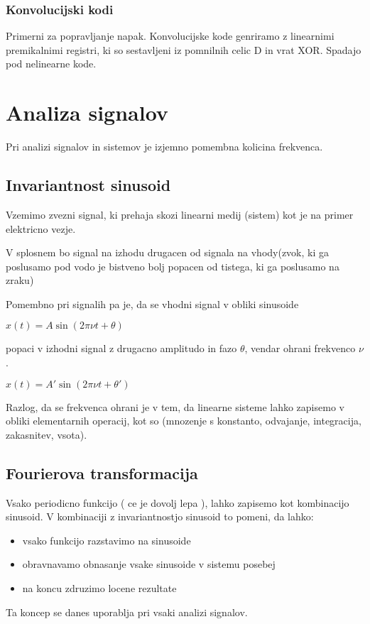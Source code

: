 \documentclass{article}
\begin{document}
\begin{multicols}{2}
	\subsubsection{Konvolucijski kodi}
	Primerni za popravljanje napak. Konvolucijske kode genriramo z linearnimi premikalnimi registri, ki so sestavljeni iz
	pomnilnih celic D in vrat XOR. Spadajo pod nelinearne kode.

	\section{Analiza signalov}
	Pri analizi signalov in sistemov je izjemno pomembna kolicina frekvenca.

	\subsection{Invariantnost sinusoid}
	Vzemimo zvezni signal, ki prehaja skozi linearni medij (sistem) kot je na primer elektricno vezje.

	V splosnem bo signal na izhodu drugacen od signala na vhody(zvok, ki ga poslusamo pod vodo je bistveno bolj popacen od tistega,
	ki ga poslusamo na zraku)

	Pomembno pri signalih pa je, da se vhodni signal v obliki sinusoide
	\begin{center}
		\begin{math}
			x(t) = A \sin (2 \pi \nu t + \theta)
		\end{math}
	\end{center}
	popaci v izhodni signal z drugacno amplitudo in fazo $\theta$, vendar ohrani frekvenco $\nu$.
	\begin{center}
		\begin{math}
			x(t) = A' \sin (2 \pi \nu t + \theta')
		\end{math}
	\end{center}
	Razlog, da se frekvenca
	ohrani je v tem, da linearne sisteme lahko zapisemo v obliki elementarnih operacij, kot so (mnozenje s konstanto, odvajanje,
	integracija, zakasnitev, vsota).

	\subsection{Fourierova transformacija}
	Vsako periodicno funkcijo ( ce je dovolj lepa ), lahko zapisemo kot kombinacijo sinusoid.
	V kombinaciji z invariantnostjo sinusoid to pomeni, da lahko:
	\begin{itemize}
		\item vsako funkcijo razstavimo na sinusoide
		\item obravnavamo obnasanje vsake sinusoide v sistemu posebej
		\item na koncu zdruzimo locene rezultate
	\end{itemize}
	Ta koncep se danes uporablja pri vsaki analizi signalov.


\end{multicols}
\end{document}
